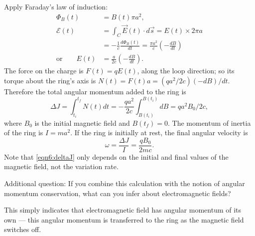 \documentclass[makesolutionspdf]{esg8022pset}
\begin{document}
\begin{solution}
  Apply Faraday's law of induction:
  \begin{align*}
    \Phi_B(t) & = B(t)\pi a^2, \\
    {\mathcal{E}}(t) & = \int_C \vec{E}(t)\cdot d\vec{s} = E(t)\times 2\pi a \\
      & = -\frac{1}{c}\frac{d\Phi_B(t)}{dt}=\frac{\pi a^2}{c}\left(-\frac{dB}{dt}\right) \\
  \text{or}\qquad E(t) & = \frac{a}{2c}\left(-\frac{dB}{dt}\right).
  \end{align*}
  The force on the charge is $F(t)=qE(t)$, along the loop
  direction; so its torque about the ring's axis is $N(t)=F(t)a=
  (qa^2/2c)(-dB)/dt$.  Therefore the total angular momentum added to the ring is
  \begin{equation}\label{eqn6:deltaJ}
    \Delta J=\int_{t_{i}}^{t_{f}} N(t)dt=-\frac{qa^2}{2c}\int_{B(t_{i})}^{B(t_{i})}dB=qa^2 B_0/2c,
  \end{equation}
  where $B_0$ is the initial magnetic field and $B(t_{f})=0$.  The
  momentum of inertia of the ring is  $I=ma^2$.  If the ring is
  initially at rest, the final angular velocity is
  \begin{equation}
    \omega=\frac{\Delta J}{I}=\frac{qB_0}{2mc}.
  \end{equation}
  Note that \autoref{eqn6:deltaJ} only depends on the initial and final
  values of the magnetic field, not the variation rate.

  Additional question: If you combine this calculation with the notion
  of angular momentum conservation, what can you infer about
  electromagnetic fields?

  This simply indicates that electromagnetic field has angular momentum
  of its own --- this angular momentum is transferred to the ring as the
  magnetic field switches off.
\end{solution}
\end{document}

